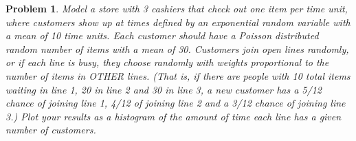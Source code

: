 \documentclass{article}
\newtheorem{problem}{Problem}
\begin{document}
\begin{problem}

Model a store with 3 cashiers that check out one item per time unit, where customers show up at times defined by an exponential random variable with a mean of 10 time units.  Each customer should have a Poisson distributed random number of items with a mean of 30.  Customers join open lines randomly, or if each line is busy, they choose randomly with weights proportional to the number of items in OTHER lines. (That is, if there are people with 10 total items waiting in line 1, 20 in line 2 and 30 in line 3, a new customer has a 5/12 chance of joining line 1, 4/12 of joining line 2 and a 3/12 chance of joining line 3.)  Plot your results as a histogram of the amount of time each line has a given number of customers.

\end{problem}
\end{document}

